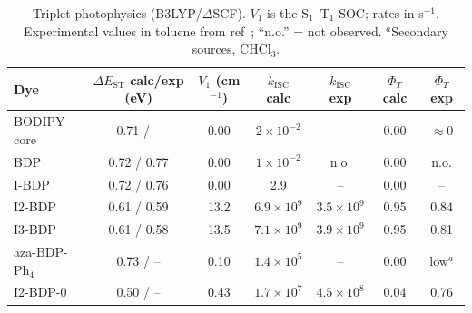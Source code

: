 \documentclass[journal=jctcce,manuscript=article,layout=twocolumn]{achemso}
\newcommand{\kisc}{k_\mathrm{ISC}}
\begin{document}
\begin{table}
  \caption{Triplet photophysics (B3LYP/$\Delta$SCF). $V_1$ is the S$_1$--T$_1$ SOC; rates in s$^{-1}$.
  Experimental values in toluene from ref~; ``n.o.'' = not observed. $^a$Secondary sources,
  CHCl$_3$.}
  \label{tab:isc}
  \begin{tabular}{lcccccc}
    \toprule
    Dye & $\Delta E_\mathrm{ST}$ calc/exp (eV) & $V_1$ (cm$^{-1}$) & $\kisc$ calc & $\kisc$ exp &
    $\Phi_T$ calc & $\Phi_T$ exp \\
    \midrule
    BODIPY core    & 0.71 / --    & 0.00 & $2\times10^{-2}$ & --  & 0.00 & $\approx0$ \\
    BDP            & 0.72 / 0.77  & 0.00 & $1\times10^{-2}$ & n.o. & 0.00 & n.o. \\
    I-BDP          & 0.72 / 0.76  & 0.00 & 2.9 & -- & 0.00 & -- \\
    I2-BDP         & 0.61 / 0.59  & 13.2 & $6.9\times10^{9}$ & $3.5\times10^{9}$ & 0.95 & 0.84 \\
    I3-BDP         & 0.61 / 0.58  & 13.5 & $7.1\times10^{9}$ & $3.9\times10^{9}$ & 0.95 & 0.81 \\
    aza-BDP-Ph$_4$ & 0.73 / --    & 0.10 & $1.4\times10^{5}$ & -- & 0.00 & low$^a$ \\
    \midrule
    I2-BDP-0       & 0.50 / --    & 0.43 & $1.7\times10^{7}$ & $4.5\times10^{8}$ & 0.04 & 0.76 \\
    \bottomrule
  \end{tabular}
\end{table}
\end{document}
